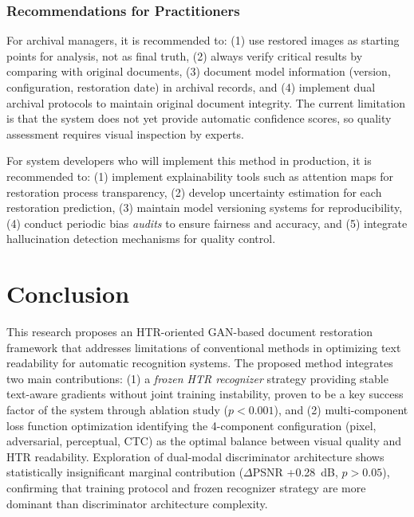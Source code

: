 \documentclass[journal]{IEEEtran}
\begin{document}
\subsubsection{Recommendations for Practitioners}

For archival managers, it is recommended to: (1) use restored images as starting points for analysis, not as final truth, (2) always verify critical results by comparing with original documents, (3) document model information (version, configuration, restoration date) in archival records, and (4) implement dual archival protocols to maintain original document integrity. The current limitation is that the system does not yet provide automatic confidence scores, so quality assessment requires visual inspection by experts.

For system developers who will implement this method in production, it is recommended to: (1) implement explainability tools such as attention maps for restoration process transparency, (2) develop uncertainty estimation for each restoration prediction, (3) maintain model versioning systems for reproducibility, (4) conduct periodic bias \textit{audits} to ensure fairness and accuracy, and (5) integrate hallucination detection mechanisms for quality control.

\section{Conclusion}

This research proposes an HTR-oriented GAN-based document restoration framework that addresses limitations of conventional methods in optimizing text readability for automatic recognition systems. The proposed method integrates two main contributions: (1) a \textit{frozen HTR recognizer} strategy providing stable text-aware gradients without joint training instability, proven to be a key success factor of the system through ablation study ($p<0.001$), and (2) multi-component loss function optimization identifying the 4-component configuration (pixel, adversarial, perceptual, CTC) as the optimal balance between visual quality and HTR readability. Exploration of dual-modal discriminator architecture shows statistically insignificant marginal contribution ($\Delta$PSNR +0.28~dB, $p>0.05$), confirming that training protocol and frozen recognizer strategy are more dominant than discriminator architecture complexity.
\end{document}
